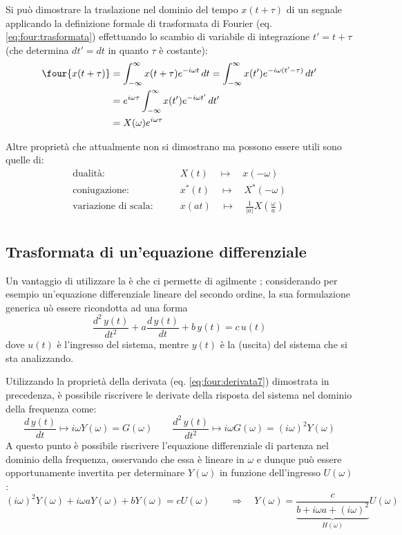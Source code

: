 		\begin{dimostrazione}
			Si può dimostrare la traslazione nel dominio del tempo $x(t + \tau)$ di un segnale applicando la definizione formale di trasformata di Fourier (eq. \ref{eq:four:trasformata}) effettuando lo scambio di variabile di integrazione $t' = t + \tau$ (che determina $dt' = dt$ in quanto $\tau$ è costante):
			\begin{align*}
				\four{x(t+\tau)} & = \int_{-\infty}^\infty x(t+\tau) e^{-i\omega t}\, dt = \int_{-\infty}^\infty x(t') e^{-i\omega (t'-\tau)} \, dt' \\
				& = e^{i\omega \tau} \int_{-\infty}^\infty x(t') e^{-i\omega t'} \, dt' \\
				& = X(\omega) e^{i\omega \tau}
			\end{align*}
		\end{dimostrazione}		
		Altre proprietà che attualmente non si dimostrano ma possono essere utili sono quelle di:
		\begin{align*}
			\textrm{dualità:}& \qquad X(t) \quad \mapsto \quad x(-\omega) \\
			\textrm{coniugazione:}& \qquad x^*(t) \quad \mapsto \quad X^*(-\omega) \\
			\textrm{variazione di scala:}& \qquad x(at) \quad \mapsto \quad \frac 1 {|a|} X\left(\frac \omega a\right) \\
		\end{align*}
		
	\subsection{Trasformata di un'equazione differenziale} \label{sec:four:eqdiff}
		
			Un vantaggio di utilizzare la  è che ci permette di  agilmente ; considerando per esempio un'equazione differenziale lineare del secondo ordine, la sua formulazione generica uò essere ricondotta ad una  forma
			\[ \frac{d^2\,y(t)}{dt^2} + a \frac{d\, y(t)}{dt} + b\, y(t) = c\,u(t)\]
			dove $u(t)$ è l'ingresso  del sistema, mentre $y(t)$ è la  (uscita) del sistema che si sta analizzando. 
			
			Utilizzando la proprietà della derivata (eq. \ref{eq:four:derivata7}) dimostrata in precedenza, è possibile riscrivere le derivate della risposta del sistema nel dominio della frequenza come:
			\[ \frac{d\,y(t)}{dt}\mapsto i\omega Y(\omega) = G(\omega) \qquad  \frac{d^2\,y(t)}{dt^2}\mapsto i\omega G(\omega) = (i\omega)^2 Y(\omega)  \]
			A questo punto è possibile riscrivere l'equazione differenziale di partenza nel dominio della frequenza, osservando che essa è lineare in $\omega$ e dunque può essere opportunamente invertita per determinare $Y(\omega)$ in funzione dell'ingresso $U(\omega)$:
			\[  (i\omega)^2 Y(\omega) + i\omega a Y(\omega) + bY(\omega) = c U(\omega) \qquad \Rightarrow\quad Y(\omega) = \underbrace{\frac c {b + i\omega a + (i\omega)^2}}_{H(\omega)} U(\omega) \]
			
